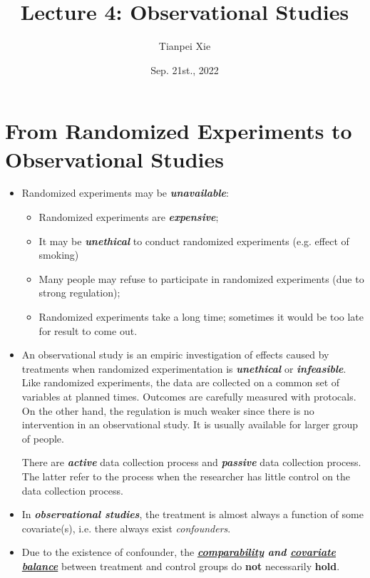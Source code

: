 \documentclass[11pt]{article}
\begin{document}
\title{Lecture 4: Observational Studies}
\author{ Tianpei Xie}
\date{Sep. 21st., 2022 }
\maketitle
\tableofcontents
\newpage
\allowdisplaybreaks
\section{From Randomized Experiments to Observational Studies}
\begin{itemize}
\item Randomized experiments may be \emph{\textbf{unavailable}}:
\begin{itemize}
\item Randomized experiments are \emph{\textbf{expensive}};
\item It may be \emph{\textbf{unethical}} to conduct randomized experiments (e.g. effect of smoking)
\item Many people may refuse to participate in randomized experiments (due to strong regulation); 
\item Randomized experiments take a long time; sometimes it would be too late for result to come out.
\end{itemize} 

\item An observational study is an empiric investigation of effects caused by treatments when randomized experimentation is \emph{\textbf{unethical}} or \emph{\textbf{infeasible}}. Like randomized experiments, the data are collected on a common set of variables at planned times. Outcomes are carefully measured with protocals. On the other hand, the regulation is much weaker since there is no intervention in an observational study. It is usually available for larger group of people.

There are \emph{\textbf{active}} data collection process and \emph{\textbf{passive}} data collection process. The latter refer to the process when the researcher has little control on the data collection process.

\item In \emph{\textbf{observational studies}}, the treatment is almost always a function of some covariate(s), i.e. there always exist \emph{confounders}. 

\item Due to the existence of confounder, the \emph{\textbf{\underline{comparability} and \underline{covariate balance}}} between treatment and control groups do \textbf{not} necessarily \textbf{hold}.  


\end{itemize}
\end{document}
